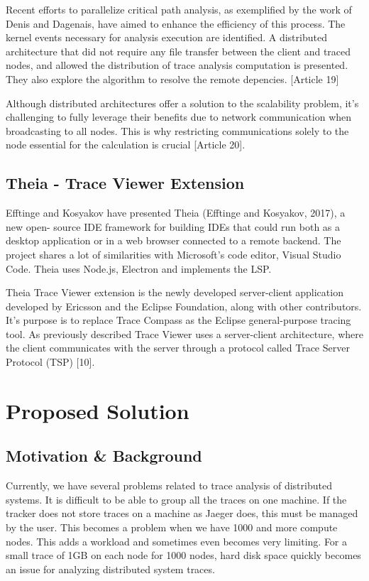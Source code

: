 Recent efforts to parallelize critical path analysis, as exemplified by the work of Denis and Dagenais, have aimed to enhance the efficiency of this process. The kernel events necessary for analysis execution are identified. A distributed architecture that did not require any file transfer between the client and traced nodes, and allowed the distribution of trace analysis computation is presented. They also explore the algorithm to resolve the remote depencies. [Article 19]

Although distributed architectures offer a solution to the scalability problem, it's challenging to fully leverage their benefits due to network communication when broadcasting to all nodes. This is why restricting communications solely to the node essential for the calculation is crucial [Article 20].


\subsection{Theia - Trace Viewer Extension}

Eﬀtinge and Kosyakov have presented Theia (Eﬀtinge and Kosyakov, 2017), a new open-
source IDE framework for building IDEs that could run both as a desktop application or in
a web browser connected to a remote backend. The project shares a lot of similarities with
Microsoft's code editor, Visual Studio Code. Theia uses Node.js, Electron and implements
the LSP.


Theia Trace Viewer extension is the newly developed server-client application developed by Ericsson and the Eclipse Foundation, along with other contributors. It's purpose is to replace Trace Compass as the Eclipse general-purpose tracing tool. As previously described Trace Viewer uses a server-client architecture, where the client communicates with the server through a protocol called Trace Server Protocol (TSP) [10].

\section{Proposed Solution}


\subsection{Motivation \& Background}

Currently, we have several problems related to trace analysis of distributed systems. It is difficult to be able to group all the traces on one machine. If the tracker does not store traces on a machine as Jaeger does, this must be managed by the user. This becomes a problem when we have 1000 and more compute nodes. This adds a workload and sometimes even becomes very limiting. For a small trace of 1GB on each node for 1000 nodes, hard disk space quickly becomes an issue for analyzing distributed system traces.

